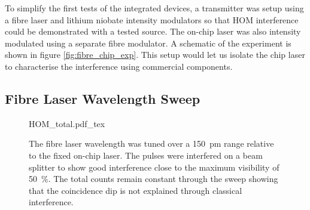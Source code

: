 To simplify the first tests of the integrated devices, a transmitter was setup using a fibre laser and lithium niobate intensity modulators so that \ac{HOM} interference could be demonstrated with a tested source. The on-chip laser was also intensity modulated using a separate fibre modulator. A schematic of the experiment is shown in figure \ref{fig:fibre_chip_exp}. This setup would let us isolate the chip laser to characterise the interference using commercial components.





\subsection{Fibre Laser Wavelength Sweep}

\begin{figure}[p]
	\centering
	\small
	\def\svgwidth{0.9\textwidth} 
	{HOM_total.pdf_tex}
	\caption[HOM interference between fibre components and chip]{The fibre laser wavelength was tuned over a \SI{150}{pm} range relative to the fixed on-chip laser. The pulses were interfered on a beam splitter to show good interference close to the maximum visibility of \SI{50}{\percent}. The total counts remain constant through the sweep showing that the coincidence dip is not explained through classical interference.}
	\label{fig:fibre_wavelength_sweep}
\end{figure}


